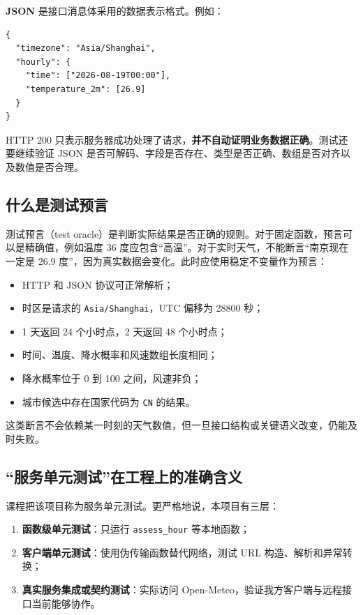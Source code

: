 \documentclass[UTF8,zihao=-4,a4paper]{ctexart}
\newcommand{\term}[1]{\textbf{#1}}
\newcommand{\code}[1]{\texttt{#1}}
\newcommand{\risk}[1]{\textcolor{CodeRed}{\textbf{#1}}}
\begin{document}
\term{JSON} 是接口消息体采用的数据表示格式。例如：

\begin{lstlisting}[style=shellstyle]
{
  "timezone": "Asia/Shanghai",
  "hourly": {
    "time": ["2026-08-19T00:00"],
    "temperature_2m": [26.9]
  }
}
\end{lstlisting}

HTTP 200 只表示服务器成功处理了请求，\risk{并不自动证明业务数据正确}。测试还要继续验证 JSON 是否可解码、字段是否存在、类型是否正确、数组是否对齐以及数值是否合理。

\subsection{什么是测试预言}

测试预言（test oracle）是判断实际结果是否正确的规则。对于固定函数，预言可以是精确值，例如温度 36 度应包含“高温”。对于实时天气，不能断言“南京现在一定是 26.9 度”，因为真实数据会变化。此时应使用稳定不变量作为预言：

\begin{itemize}
  \item HTTP 和 JSON 协议可正常解析；
  \item 时区是请求的 \code{Asia/Shanghai}，UTC 偏移为 28800 秒；
  \item 1 天返回 24 个小时点，2 天返回 48 个小时点；
  \item 时间、温度、降水概率和风速数组长度相同；
  \item 降水概率位于 0 到 100 之间，风速非负；
  \item 城市候选中存在国家代码为 \code{CN} 的结果。
\end{itemize}

这类断言不会依赖某一时刻的天气数值，但一旦接口结构或关键语义改变，仍能及时失败。

\subsection{“服务单元测试”在工程上的准确含义}

课程把该项目称为服务单元测试。更严格地说，本项目有三层：

\begin{enumerate}
  \item \term{函数级单元测试}：只运行 \code{assess\_hour} 等本地函数；
  \item \term{客户端单元测试}：使用伪传输函数替代网络，测试 URL 构造、解析和异常转换；
  \item \term{真实服务集成或契约测试}：实际访问 Open-Meteo，验证我方客户端与远程接口当前能够协作。
\end{enumerate}
\end{document}
